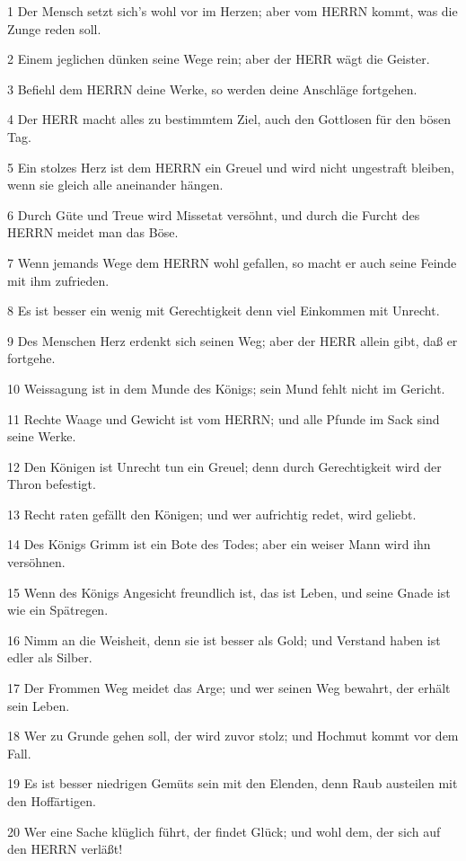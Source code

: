 \par 1 Der Mensch setzt sich's wohl vor im Herzen; aber vom HERRN kommt, was die Zunge reden soll.
\par 2 Einem jeglichen dünken seine Wege rein; aber der HERR wägt die Geister.
\par 3 Befiehl dem HERRN deine Werke, so werden deine Anschläge fortgehen.
\par 4 Der HERR macht alles zu bestimmtem Ziel, auch den Gottlosen für den bösen Tag.
\par 5 Ein stolzes Herz ist dem HERRN ein Greuel und wird nicht ungestraft bleiben, wenn sie gleich alle aneinander hängen.
\par 6 Durch Güte und Treue wird Missetat versöhnt, und durch die Furcht des HERRN meidet man das Böse.
\par 7 Wenn jemands Wege dem HERRN wohl gefallen, so macht er auch seine Feinde mit ihm zufrieden.
\par 8 Es ist besser ein wenig mit Gerechtigkeit denn viel Einkommen mit Unrecht.
\par 9 Des Menschen Herz erdenkt sich seinen Weg; aber der HERR allein gibt, daß er fortgehe.
\par 10 Weissagung ist in dem Munde des Königs; sein Mund fehlt nicht im Gericht.
\par 11 Rechte Waage und Gewicht ist vom HERRN; und alle Pfunde im Sack sind seine Werke.
\par 12 Den Königen ist Unrecht tun ein Greuel; denn durch Gerechtigkeit wird der Thron befestigt.
\par 13 Recht raten gefällt den Königen; und wer aufrichtig redet, wird geliebt.
\par 14 Des Königs Grimm ist ein Bote des Todes; aber ein weiser Mann wird ihn versöhnen.
\par 15 Wenn des Königs Angesicht freundlich ist, das ist Leben, und seine Gnade ist wie ein Spätregen.
\par 16 Nimm an die Weisheit, denn sie ist besser als Gold; und Verstand haben ist edler als Silber.
\par 17 Der Frommen Weg meidet das Arge; und wer seinen Weg bewahrt, der erhält sein Leben.
\par 18 Wer zu Grunde gehen soll, der wird zuvor stolz; und Hochmut kommt vor dem Fall.
\par 19 Es ist besser niedrigen Gemüts sein mit den Elenden, denn Raub austeilen mit den Hoffärtigen.
\par 20 Wer eine Sache klüglich führt, der findet Glück; und wohl dem, der sich auf den HERRN verläßt!
